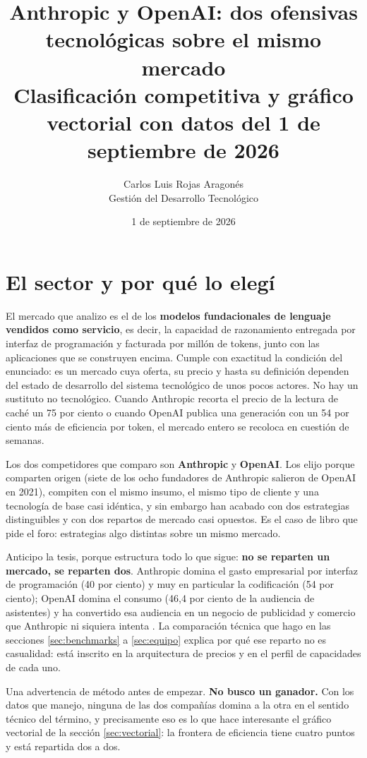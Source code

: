 \documentclass[11pt,letterpaper]{article}
\title{\vspace{-1.2cm}\textbf{Anthropic y OpenAI: dos ofensivas tecnológicas
sobre el mismo mercado}\\
\large Clasificación competitiva y gráfico vectorial con datos del 1 de
septiembre de 2026}
\author{Carlos Luis Rojas Aragonés\\
\small Gestión del Desarrollo Tecnológico}
\date{\small 1 de septiembre de 2026}
\begin{document}
\maketitle
\vspace{-0.6em}

\section{El sector y por qué lo elegí}

El mercado que analizo es el de los \textbf{modelos fundacionales de lenguaje
vendidos como servicio}, es decir, la capacidad de razonamiento entregada por
interfaz de programación y facturada por millón de tokens, junto con las
aplicaciones que se construyen encima. Cumple con exactitud la condición del
enunciado: es un mercado cuya oferta, su precio y hasta su definición dependen
del estado de desarrollo del sistema tecnológico de unos pocos actores. No hay
un sustituto no tecnológico. Cuando Anthropic recorta el precio de la lectura de
caché un 75 por ciento o cuando OpenAI publica una generación con un 54 por
ciento más de eficiencia por token, el mercado entero se recoloca en cuestión de
semanas.

Los dos competidores que comparo son \textbf{Anthropic} y \textbf{OpenAI}. Los
elijo porque comparten origen (siete de los ocho fundadores de Anthropic salieron
de OpenAI en 2021), compiten con el mismo insumo, el mismo tipo de cliente y una
tecnología de base casi idéntica, y sin embargo han acabado con dos estrategias
distinguibles y con dos repartos de mercado casi opuestos. Es el caso de libro
que pide el foro: estrategias algo distintas sobre un mismo mercado.

Anticipo la tesis, porque estructura todo lo que sigue: \textbf{no se reparten un
mercado, se reparten dos}. Anthropic domina el gasto empresarial por interfaz de
programación (40 por ciento) y muy en particular la codificación (54 por ciento);
OpenAI domina el consumo (46,4 por ciento de la audiencia de asistentes) y ha
convertido esa audiencia en un negocio de publicidad y comercio que Anthropic ni
siquiera intenta \parencite{menlo2025,sensortower2026}. La comparación técnica
que hago en las secciones \ref{sec:benchmarks} a \ref{sec:equipo} explica por qué ese reparto no es casualidad:
está inscrito en la arquitectura de precios y en el perfil de capacidades de cada
uno.

Una advertencia de método antes de empezar. \textbf{No busco un ganador.} Con los
datos que manejo, ninguna de las dos compañías domina a la otra en el sentido
técnico del término, y precisamente eso es lo que hace interesante el gráfico
vectorial de la sección \ref{sec:vectorial}: la frontera de eficiencia tiene cuatro puntos y está
repartida dos a dos.
\end{document}
